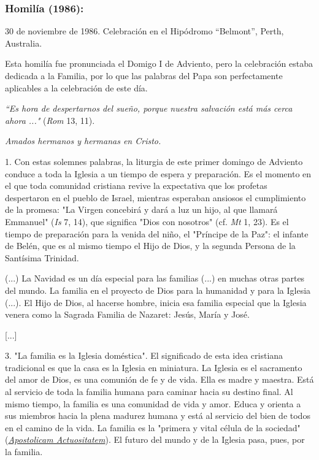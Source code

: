\subsubsection{Homilía (1986): }
30 de noviembre de 1986. Celebración en el Hipódromo ``Belmont'', Perth,
Australia.

Esta homilía fue pronunciada el Domigo I de Adviento, pero la celebración estaba dedicada a la Familia, por lo que las palabras del Papa son perfectamente aplicables a la celebración de este día.

\emph{``Es hora de despertarnos del sueño, porque nuestra salvación está
	más cerca ahora ..."} (\emph{Rom} 13, 11).

\emph{Amados hermanos y hermanas en Cristo.}

1. Con estas solemnes palabras, la liturgia de este primer domingo de
Adviento conduce a toda la Iglesia a un tiempo de espera y preparación.
Es el momento en el que toda comunidad cristiana revive la expectativa
que los profetas despertaron en el pueblo de Israel, mientras esperaban
ansiosos el cumplimiento de la promesa: "La Virgen concebirá y dará a
luz un hijo, al que llamará Emmanuel" (\emph{Is} 7, 14), que significa
"Dios con nosotros" (cf. \emph{Mt} 1, 23). Es el tiempo de preparación
para la venida del niño, el "Príncipe de la Paz": el infante de Belén,
que es al mismo tiempo el Hijo de Dios, y la segunda Persona de la
Santísima Trinidad.

(...) La Navidad es un día especial para las familias (...) en muchas
otras partes del mundo. La familia en el proyecto de Dios para la
humanidad y para la Iglesia (...). El Hijo de Dios, al hacerse hombre,
inicia esa familia especial que la Iglesia venera como la Sagrada
Familia de Nazaret: Jesús, María y José.

{[}...{]}

3. "La familia es la Iglesia doméstica". El significado de esta idea
cristiana tradicional es que la casa es la Iglesia en miniatura. La
Iglesia es el sacramento del amor de Dios, es una comunión de fe y de
vida. Ella es madre y maestra. Está al servicio de toda la familia
humana para caminar hacia su destino final. Al mismo tiempo, la familia
es una comunidad de vida y amor. Educa y orienta a sus miembros hacia la
plena madurez humana y está al servicio del bien de todos en el camino
de la vida. La familia es la "primera y vital célula de la sociedad"
(\href{http://www.vatican.va/archive/hist_councils/ii_vatican_council/documents/vat-ii_decree_19651118_apostolicam-actuositatem_it.html}{\emph{\emph{Apostolicam
			Actuositatem}}}). El futuro del mundo y de la Iglesia pasa, pues, por la
familia.

